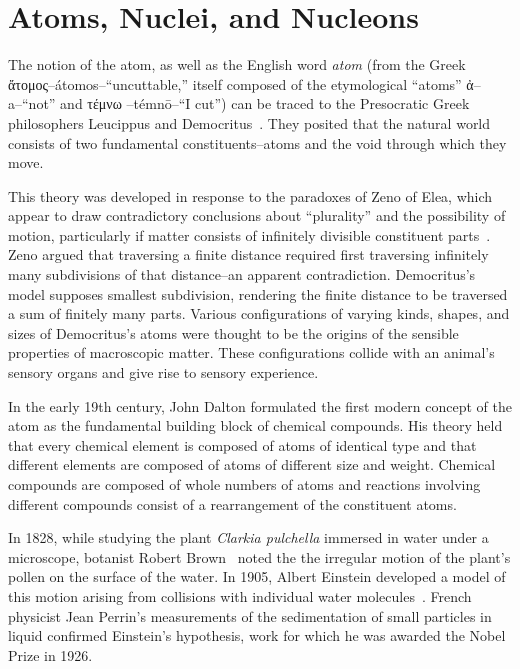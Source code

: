 \section{Atoms, Nuclei, and Nucleons}

The notion of the atom, as well as the English word \textit{atom}
(from the Greek \textgreek{ἄτομος}--átomos--``uncuttable,''
itself composed of the etymological ``atoms''
\textgreek{ἀ}--a--``not''
and
\textgreek{τέμνω }--témnō--``I cut'') can be traced to the Presocratic Greek
philosophers Leucippus and Democritus~\cite{sep-atomism-ancient}.
They posited that the natural world consists of two fundamental
constituents--atoms and the void through which they move.


This theory was developed in response to the paradoxes of Zeno of
Elea, which appear to draw contradictory conclusions about ``plurality'' and
the possibility of motion, particularly if matter consists of infinitely divisible
constituent parts~\cite{sep-paradox-zeno}.
Zeno argued that traversing a finite distance required first traversing
infinitely many subdivisions of that distance--an apparent contradiction.
Democritus's model supposes smallest subdivision, rendering the finite distance
to be traversed a sum of finitely many parts.
Various configurations of varying kinds, shapes, and sizes of Democritus's
atoms were thought to be the origins of the sensible properties of macroscopic
matter.
These configurations collide with an animal's sensory organs and give rise to
sensory experience.


In the early 19th century, John Dalton formulated the first modern concept of
the atom as the fundamental building block of chemical compounds.
His theory held that every chemical element is composed of atoms of identical
type and that different elements are composed of atoms of different size and
weight.
Chemical compounds are composed of whole numbers of atoms and reactions
involving different compounds consist of a rearrangement of the constituent
atoms.


In 1828, while studying the plant \textit{Clarkia pulchella} immersed in water
under a microscope,
botanist Robert Brown~\cite{Brown_1828} noted the
the irregular motion of the plant's pollen on the surface of the water.
In 1905, Albert Einstein developed a model of this motion  arising from
collisions with individual water molecules~\cite{Einstein_1905}.
French physicist Jean Perrin's measurements of the sedimentation of small
particles in liquid confirmed Einstein's hypothesis, work for which he was
awarded the Nobel Prize in 1926.


